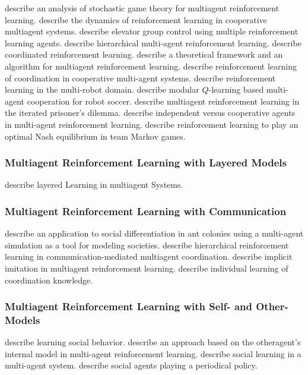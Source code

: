 \cite{bowling:2000} describe an analysis of stochastic game theory for multiagent reinforcement learning.
\cite{claus:1998} describe the dynamics of reinforcement learning in cooperative multiagent systems.
\cite{crites:1998} describe elevator group control using multiple reinforcement learning agents.
\cite{ghavamzadeh:2006} describe hierarchical multi-agent reinforcement learning.
\cite{guestrin:2002} describe coordinated reinforcement learning.
\cite{hu:1998} describe a theoretical framework and an algorithm for multiagent reinforcement learning.
\cite{kapetanakis:2002} describe reinforcement learning of coordination in cooperative multi-agent systems.
\cite{mataric:1997a} describe reinforcement learning in the multi-robot domain.
\cite{park:2001} describe modular $Q$-learning based multi-agent cooperation for robot soccer.
\cite{sandholm:1996} describe multiagent reinforcement learning in the iterated prisoner's dilemma.
\cite{tan:1997} describe independent versus cooperative agents in multi-agent reinforcement learning.
\cite{wang:2003} describe reinforcement learning to play an optimal Nash equilibrium in team Markov games.

\subsubsection{Multiagent Reinforcement Learning with Layered Models}
\cite{stone:1997} describe layered Learning in multiagent Systems.

\subsubsection{Multiagent Reinforcement Learning with Communication}

\cite{drogoul:1994} describe an application to social differentiation in ant colonies using a multi-agent simulation as a tool for modeling societies.
\cite{fischer:2004} describe hierarchical reinforcement learning in communication-mediated multiagent coordination.
\cite{price:1999} describe implicit imitation in multiagent reinforcement learning.
\cite{sen:1998} describe individual learning of coordination knowledge.

\subsubsection{Multiagent Reinforcement Learning with Self- and Other- Models}

\cite{mataric:1997b} describe learning social behavior.
\cite{nagayuki:2000} describe an approach based on the otheragent's internal model in multi-agent reinforcement learning.
\cite{noble:2004} describe social learning in a multi-agent system.
\cite{nowe:2001} describe social agents playing a periodical policy.

